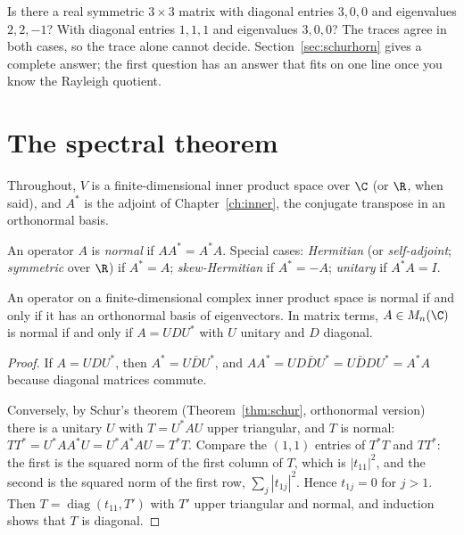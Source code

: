 \begin{think}
Is there a real symmetric $3\times3$ matrix with diagonal entries $3,0,0$ and eigenvalues $2,2,-1$? With diagonal entries
$1,1,1$ and eigenvalues $3,0,0$? The traces agree in both cases, so the trace alone cannot decide. Section~\ref{sec:schurhorn}
gives a complete answer; the first question has an answer that fits on one line once you know the Rayleigh quotient.
\end{think}

\section{The spectral theorem}

Throughout, $V$ is a finite-dimensional inner product space over $\C$ (or $\R$, when said), and $A^*$ is the adjoint of
Chapter~\ref{ch:inner}, the conjugate transpose in an orthonormal basis.

\begin{definition}\label{def:normal}
An operator $A$ is \emph{normal} if $AA^*=A^*A$. Special cases: \emph{Hermitian} (or \emph{self-adjoint}; \emph{symmetric}
over $\R$) if $A^*=A$; \emph{skew-Hermitian} if $A^*=-A$; \emph{unitary} if $A^*A=I$.
\end{definition}

\begin{theorem}\label{thm:spectral}
An operator on a finite-dimensional complex inner product space is normal if and only if it has an orthonormal basis of
eigenvectors. In matrix terms, $A\in M_n(\C)$ is normal if and only if $A=UDU^*$ with $U$ unitary and $D$ diagonal.
\end{theorem}
\begin{proof}
If $A=UDU^*$, then $A^*=U\bar DU^*$, and $AA^*=U D\bar DU^*=U\bar DDU^*=A^*A$ because diagonal matrices commute.

Conversely, by Schur's theorem (Theorem~\ref{thm:schur}, orthonormal version) there is a unitary $U$ with $T=U^*AU$ upper
triangular, and $T$ is normal: $TT^*=U^*AA^*U=U^*A^*AU=T^*T$. Compare the $(1,1)$ entries of $T^*T$ and $TT^*$: the first is
the squared norm of the first column of $T$, which is $|t_{11}|^2$, and the second is the squared norm of the first row,
$\sum_j|t_{1j}|^2$. Hence $t_{1j}=0$ for $j>1$. Then $T=\operatorname{diag}(t_{11},T')$ with $T'$ upper triangular and
normal, and induction shows that $T$ is diagonal.
\end{proof}

